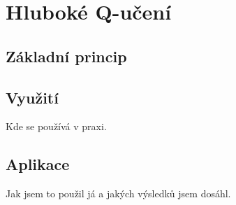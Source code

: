 
\chapter{Hluboké Q-učení}

\section{Základní princip}

\section{Využití}
Kde se používá v praxi.


\section{Aplikace}
Jak jsem to použil já a jakých výsledků jsem dosáhl.


